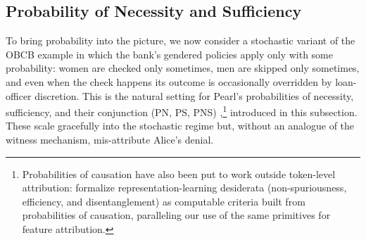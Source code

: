 \subsection{Probability of Necessity and Sufficiency}

To bring probability into the picture, we now consider a stochastic variant of the
OBCB example in which the bank's gendered policies apply only with some probability:
women are checked only sometimes, men are skipped only sometimes, and even when
the check happens its outcome is occasionally overridden by loan-officer
discretion. This is the natural setting for Pearl's probabilities of necessity,
sufficiency, and their conjunction (PN, PS, PNS)
\citep{pearl1999probabilities,tian2000probabilities},\footnote{Probabilities of
causation have also been put to work outside token-level attribution:
\citet{wangJordanDesiderata2021} formalize representation-learning desiderata
(non-spuriousness, efficiency, and disentanglement) as computable criteria built
from probabilities of causation, paralleling our use of the same primitives for
feature attribution.} introduced in this
subsection. These scale gracefully into the stochastic regime
but, without an analogue of the witness mechanism, mis-attribute Alice's denial.

